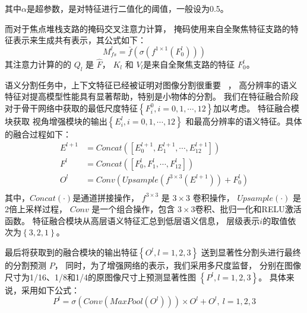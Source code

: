 %
%
%
其中$\alpha$是超参数，是对特征进行二值化的阈值，一般设为0.5。
%
%
%
%
%
%
\par
%
%
%
%
%
而对于焦点堆栈支路的掩码交叉注意力计算，
掩码使用来自全聚焦特征支路的特征表示来生成共有表示，其公式如下：
%
%
%
%
\begin{equation}
	M_{fs}^{l} = \bar{f}   \left ( \sigma \left ( 
	f^{1\times 1}
	\left ( 
	F_{0}^{l}
	\right ) 
	\right )   \right ) 
\end{equation}
%
%
%
%
其注意力计算的的 $Q_{l}$ 是  $ \hat{F}$，
$K_{l}$ 
和
$V_{l}$是来自全聚焦支路的特征 $F_{0}^{l}$。
%
%
%
%
%
\par
%
%
%
%
语义分割任务中，上下文特征已经被证明对图像分割很重要
~\cite{chen2017deeplab,chen2017rethinking,zhao2017pyramid}，
高分辨率的语义特征对提高模型性能具有显著帮助，特别是小物体的分割。
我们在特征融合阶段对于骨干网络中获取的最低尺度特征$\left \{ F_{i}^{0}, i = 0, 1, \cdots, 12 \right \}$加以考虑。
特征融合模块获取
视角增强模块的输出$\left \{ E_{i}^{l}, i = 0, 1, \cdots, 12 \right \}$
和最高分辨率的语义特征。具体的融合过程如下：
%
%
%
%
\begin{equation}
	\begin{aligned}
		E^{l+1} &= 
		Concat\left ( \left [ E_{0}^{l+1},E_{1}^{l+1},\cdots, E_{12}^{l+1} \right ]  \right )  
		\\  
		F^{l} &= 
		Concat\left ( \left [ F_{0}^{l},F_{1}^{l},\cdots, F_{12}^{l} \right ]  \right )  
		\\  
		{O^{l}}  &= Conv\left (  Upsample\left ( f^{3 \times 3} \left ( E^{l+1} \right )  \right ) + F_{0}^{l} \right )  \\
	\end{aligned}
\end{equation}
%
%
%
%
其中，$Concat(\cdot)$是通道拼接操作，
$f^{3 \times 3}$ 是 $3 \times 3 $ 卷积操作，
$ Upsample(\cdot) $ 是2倍上采样过程，
$ Conv $ 是一个组合操作，包含 $3\times 3$卷积、批归一化和RELU激活函数。
特征融合模块从高层语义特征汇总到低层语义信息，
层级表示$i$的取值依次为$\left \{ 3,2,1 \right \}$。
%
%
%
%
%
\par 
%
%
最后将获取到的融合模块的输出特征$\left \{ O^{l}, l = 1,2,3 \right \}$
送到显著性分割头进行最终的分割预测 $P$，
同时，为了增强网络的表示，我们采用多尺度监督，
分别在图像尺寸为1/16、1/8和1/4的原图像尺寸上预测显著性图
$\left \{ P^{l}, l = 1,2,3 \right \}$。
具体来说，采用如下公式：
%
%
%
%
\begin{equation}
	P^{l} = \sigma \left ( Conv\left ( MaxPool \left (  
	O^{l} \right )  \right )  \right ) 
	\times 
	O^{l} + O^{l},~ l = 1,2,3
\end{equation}
